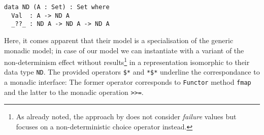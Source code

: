\begin{verbatim}
data ND (A : Set) : Set where
  Val  : A -> ND A
  _??_ : ND A -> ND A -> ND A
\end{verbatim}

Here, it comes apparent that their model is a specialisation of the generic monadic model; in case of our model we can instantiate  with a variant of the non-determinism effect  without  results\footnote{As already noted, the approach by \citeauthor{antoy2017proving} does not consider \emph{failure} values but focuses on a non-deterministic choice operator instead.} in a representation isomorphic to their data type \texttt{ND}.
The provided operators \texttt{\$*} and \texttt{*\$*} underline the correspondance to a monadic interface: The former operator corresponds to \texttt{Functor} method \texttt{fmap} and the latter to the monadic operation \texttt{>>=}.

